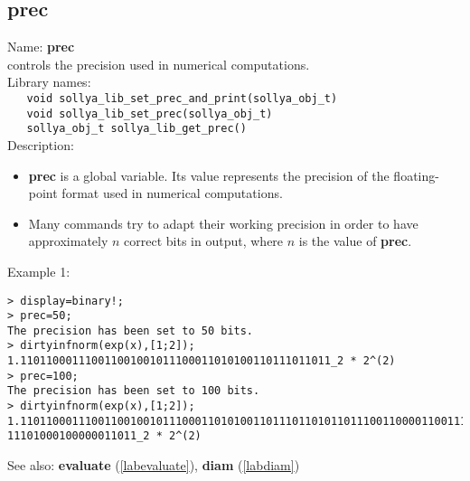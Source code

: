 \subsection{prec}
\label{labprec}
\noindent Name: \textbf{prec}\\
\phantom{aaa}controls the precision used in numerical computations.\\[0.2cm]
\noindent Library names:\\
\verb|   void sollya_lib_set_prec_and_print(sollya_obj_t)|\\
\verb|   void sollya_lib_set_prec(sollya_obj_t)|\\
\verb|   sollya_obj_t sollya_lib_get_prec()|\\[0.2cm]
\noindent Description: \begin{itemize}

\item \textbf{prec} is a global variable. Its value represents the precision of the 
   floating-point format used in numerical computations.

\item Many commands try to adapt their working precision in order to have 
   approximately $n$ correct bits in output, where $n$ is the value of \textbf{prec}.
\end{itemize}
\noindent Example 1: 
\begin{center}\begin{minipage}{15cm}\begin{Verbatim}[frame=single,commandchars=\\\|\~]
> display=binary!;
> prec=50;
The precision has been set to 50 bits.
> dirtyinfnorm(exp(x),[1;2]);
1.110110001110011001001011100011010100110111011011_2 * 2^(2)
> prec=100;
The precision has been set to 100 bits.
> dirtyinfnorm(exp(x),[1;2]);
1.110110001110011001001011100011010100110111011010110111001100001100111010001110
11101000100000011011_2 * 2^(2)
\end{Verbatim}
\end{minipage}\end{center}
See also: \textbf{evaluate} (\ref{labevaluate}), \textbf{diam} (\ref{labdiam})
